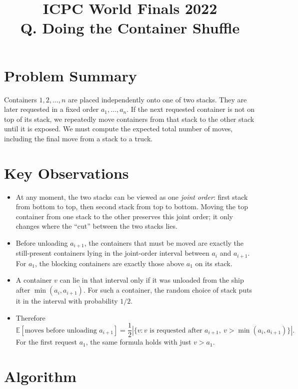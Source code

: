 \documentclass[11pt]{article}
\title{ICPC World Finals 2022\\Q. Doing the Container Shuffle}
\author{}
\date{}
\begin{document}
\maketitle

\section*{Problem Summary}

Containers $1,2,\dots,n$ are placed independently onto one of two stacks. They are later requested in a
fixed order $a_1,\dots,a_n$. If the next requested container is not on top of its stack, we repeatedly move
containers from that stack to the other stack until it is exposed. We must compute the expected total
number of moves, including the final move from a stack to a truck.

\section*{Key Observations}

\begin{itemize}[leftmargin=*]
    \item At any moment, the two stacks can be viewed as one \emph{joint order}:
    first stack from bottom to top, then second stack from top to bottom.
    Moving the top container from one stack to the other preserves this joint order; it only changes where
    the ``cut'' between the two stacks lies.
    \item Before unloading $a_{i+1}$, the containers that must be moved are exactly the still-present
    containers lying in the joint-order interval between $a_i$ and $a_{i+1}$. For $a_1$, the blocking
    containers are exactly those above $a_1$ on its stack.
    \item A container $v$ can lie in that interval only if it was unloaded from the ship after
    $\min(a_i,a_{i+1})$. For such a container, the random choice of stack puts it in the interval with
    probability $1/2$.
    \item Therefore
    \[
    \mathbb{E}[\text{moves before unloading } a_{i+1}]
    = \frac{1}{2}\left|\{v : v \text{ is requested after } a_{i+1},\ v > \min(a_i,a_{i+1})\}\right|.
    \]
    For the first request $a_1$, the same formula holds with just $v > a_1$.
\end{itemize}

\section*{Algorithm}
\end{document}
